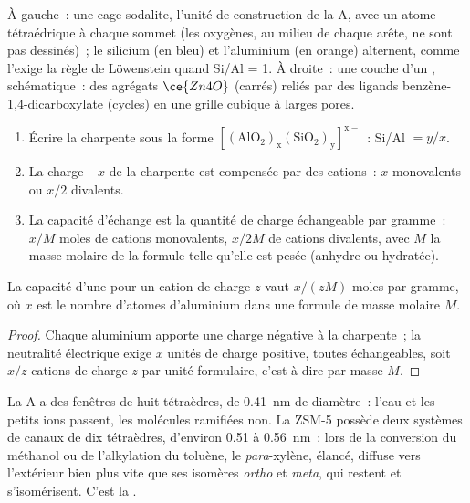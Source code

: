 \begin{omfigure}
{\small À gauche~: une cage sodalite, l'unité de construction de la
 A, avec un atome tétraédrique à chaque sommet (les oxygènes, au
milieu de chaque arête, ne sont pas dessinés)~; le silicium (en bleu) et
l'aluminium (en orange) alternent, comme l'exige la règle de Löwenstein
quand Si/Al = 1. À droite~: une couche d'un ,
schématique~: des agrégats $\ce{Zn4O}$ (carrés) reliés par des ligands
benzène-1,4-dicarboxylate (cycles) en une grille cubique à larges pores.}
\end{omfigure}

\begin{method}\label{met:b3:inorganic-materials:zeolite-formula}
\begin{enumerate}
  \item Écrire la charpente sous la forme $\mathrm{[(AlO_2)_x(SiO_2)_y]^{x-}}$~: Si/Al $= y/x$.
  \item La charge $-x$ de la charpente est compensée par des cations~: $x$ monovalents ou $x/2$
        divalents.
  \item La capacité d'échange est la quantité de charge échangeable par
        gramme~:
        $x/M$ moles de cations monovalents, $x/2M$ de cations divalents, avec $M$ la
        masse molaire de la formule telle qu'elle est pesée (anhydre ou
        hydratée).
\end{enumerate}
\end{method}

\begin{proposition}\label{prop:b3:inorganic-materials:exchange-capacity}
La capacité d'une  pour un cation de charge $z$ vaut $x/(zM)$ moles par gramme,
où $x$ est le nombre d'atomes d'aluminium dans une formule de masse molaire $M$.
\end{proposition}

\begin{proof}
Chaque aluminium apporte une charge négative à la charpente~; la neutralité
électrique exige $x$ unités de charge positive, toutes échangeables, soit
$x/z$ cations de charge $z$ par unité formulaire, c'est-à-dire par masse $M$.
\end{proof}

La  A a des fenêtres de huit tétraèdres, de \qty{0.41}{nm} de
diamètre~: l'eau et les petits ions passent, les molécules ramifiées non.
La ZSM-5 possède deux systèmes de canaux de dix tétraèdres, d'environ 0.51 à
\qty{0.56}{nm}~: lors de la conversion du méthanol ou de l'alkylation du
toluène, le \textit{para}-xylène, élancé, diffuse vers l'extérieur bien
plus vite que ses isomères \textit{ortho} et \textit{meta}, qui restent et
s'isomérisent. C'est la .

